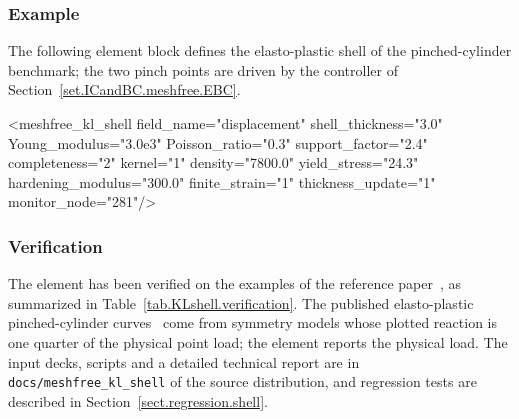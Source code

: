 \subsubsection{Example}
The following element block defines the elasto-plastic shell of the pinched-cylinder benchmark;
the two pinch points are driven by the controller of Section~\ref{set.ICandBC.meshfree.EBC}.
\begin{inputfile}
<meshfree_kl_shell field_name="displacement"
    shell_thickness="3.0" Young_modulus="3.0e3"
    Poisson_ratio="0.3" support_factor="2.4"
    completeness="2" kernel="1" density="7800.0"
    yield_stress="24.3" hardening_modulus="300.0"
    finite_strain="1" thickness_update="1"
    monitor_node="281"/>
\end{inputfile}

\subsubsection{Verification}
The element has been verified on the examples of the reference paper~\cite{WangBazilevs2025},
as summarized in Table~\ref{tab.KLshell.verification}. The published elasto-plastic
pinched-cylinder curves~\cite{WangBazilevs2025,Ambati2018,Alaydin2021} come from symmetry models
whose plotted reaction is one quarter of the physical point load; the element reports the physical
load. The input decks, scripts and a detailed technical report are in
\texttt{docs/meshfree\_kl\_shell} of the source distribution, and regression tests are described in
Section~\ref{sect.regression.shell}.
